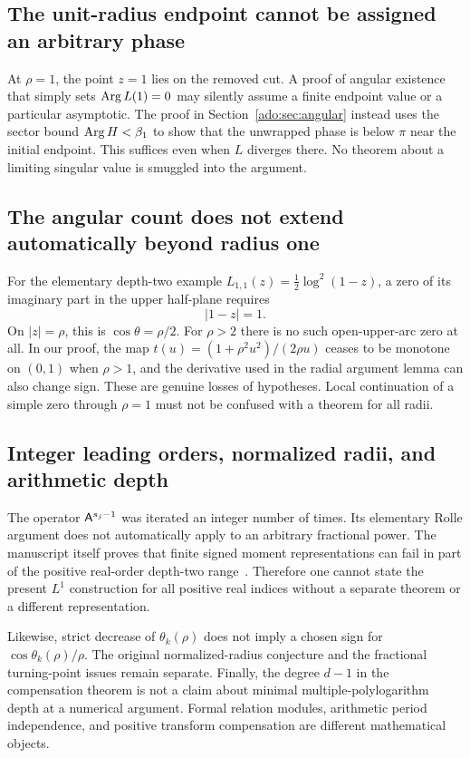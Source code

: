 \subsection{The unit-radius endpoint cannot be assigned an arbitrary phase}
At $\rho=1$, the point $z=1$ lies on the removed cut. A proof of
angular existence that simply sets $\operatorname{Arg} L(1)=0$ may silently assume
a finite endpoint value or a particular asymptotic. The proof in
Section~\ref{ado:sec:angular} instead uses the sector bound
$\operatorname{Arg} H<\beta_1$ to show that the unwrapped phase is below $\pi$
near the initial endpoint. This suffices even when $L$ diverges there.
No theorem about a limiting singular value is smuggled into the argument.

\subsection{The angular count does not extend automatically beyond radius one}
For the elementary depth-two example
$L_{1,1}(z)=\tfrac12\log^2(1-z)$, a zero of its imaginary part in
the upper half-plane requires
\[
 |1-z|=1.
\]
On $|z|=\rho$, this is $\cos\theta=\rho/2$. For $\rho>2$ there
is no such open-upper-arc zero at all. In our proof, the map
$t(u)=(1+\rho^2u^2)/(2\rho u)$ ceases to be monotone on $(0,1)$
when $\rho>1$, and the derivative used in the radial argument lemma
can also change sign. These are genuine losses of hypotheses.
Local continuation of a simple zero through $\rho=1$ must not be
confused with a theorem for all radii.

\subsection{Integer leading orders, normalized radii, and arithmetic depth}
The operator $\mathsf A^{s_j-1}$ was iterated an integer number of times.
Its elementary Rolle argument does not automatically apply to an
arbitrary fractional power. The manuscript itself proves that finite
signed moment representations can fail in part of the positive
real-order depth-two range~\cite{repoReal,repoSubcritical}. Therefore
one cannot state the present $L^1$ construction for all positive real
indices without a separate theorem or a different representation.

Likewise, strict decrease of $\theta_k(\rho)$ does not imply a chosen
sign for $\cos\theta_k(\rho)/\rho$. The original normalized-radius
conjecture and the fractional turning-point issues remain separate.
Finally, the degree $d-1$ in the compensation theorem is not a claim
about minimal multiple-polylogarithm depth at a numerical argument.
Formal relation modules, arithmetic period independence, and positive
transform compensation are different mathematical objects.


